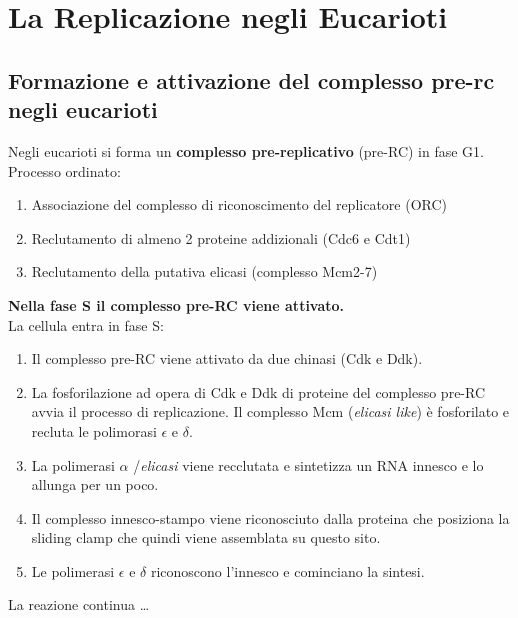 \documentclass{article}
\begin{document}
\section{La Replicazione negli Eucarioti} 
\subsection{Formazione e attivazione del complesso pre-rc negli eucarioti} Negli eucarioti si forma un \textbf{complesso pre-replicativo} (pre-RC) in fase G1.\\
Processo ordinato:
\begin{enumerate}
    \item Associazione del complesso di riconoscimento del replicatore (ORC)
    \item Reclutamento di almeno 2 proteine addizionali (Cdc6 e Cdt1)
    \item Reclutamento della putativa elicasi (complesso Mcm2-7)
\end{enumerate}
\textbf{Nella fase S il complesso pre-RC viene attivato.}\\
La cellula entra in fase S:
\begin{enumerate}
    \item Il complesso pre-RC viene attivato da due chinasi (Cdk e Ddk).
    \item La fosforilazione ad opera di Cdk e Ddk di proteine del complesso pre-RC avvia il processo di replicazione.
    \tab Il complesso Mcm (\textit{elicasi like}) è fosforilato e recluta le polimorasi  $\epsilon$  e  $\delta$.
    \item La polimerasi  $\alpha$  /\textit{elicasi} viene recclutata e sintetizza un RNA innesco e lo allunga per un poco. 
    \item Il complesso innesco-stampo viene riconosciuto dalla proteina che posiziona la sliding clamp che quindi viene assemblata su questo sito.
    \item Le polimerasi $ \epsilon $ e $ \delta $ riconoscono l'innesco e cominciano la sintesi.
\end{enumerate}
La reazione continua \dots
\end{document}
